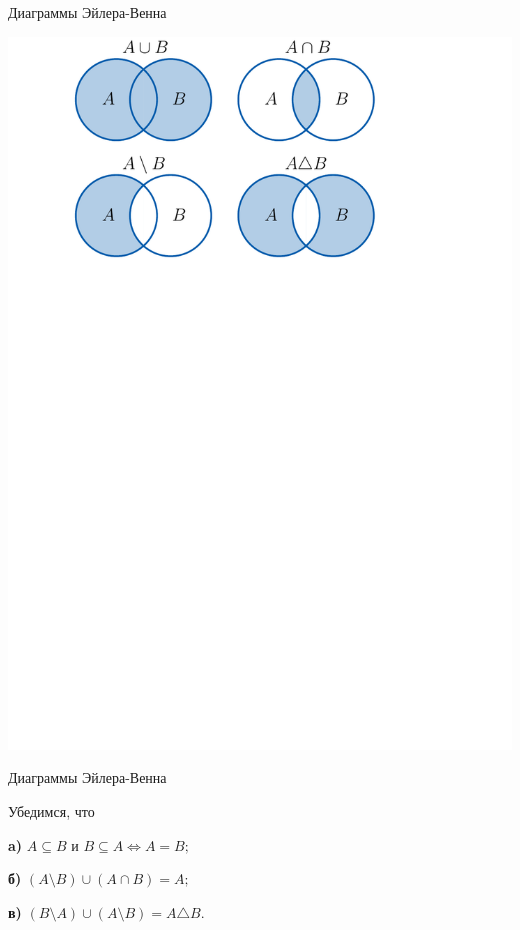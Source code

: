 \begin{frame}{Диаграммы Эйлера-Венна}

\centerline{\includegraphics[scale=0.8]{img/venn-diagr.pdf}}

\end{frame}

\begin{frame}{Диаграммы Эйлера-Венна}

\exmpl Убедимся, что

{\bf a)} $A\subseteq B$ и $B\subseteq A \iff A=B;$

{\bf б)} $(A\setminus B) \cup (A\cap B)=A;$

{\bf в)} $(B\setminus A) \cup (A\setminus B)=A\triangle B.$

\end{frame}

